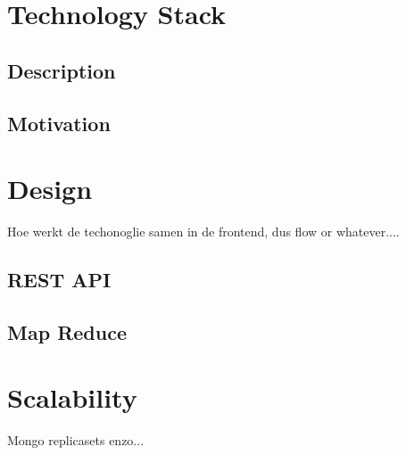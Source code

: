 \section{Technology Stack}

\subsection{Description}

\subsection{Motivation}

\section{Design}
Hoe werkt de techonoglie samen in de frontend, dus flow or whatever....

\subsection{REST API}

\subsection{Map Reduce}

\section{Scalability}
Mongo replicasets enzo...